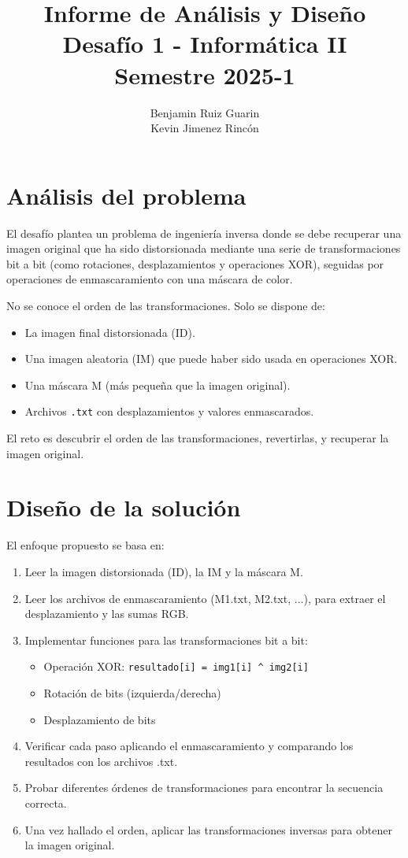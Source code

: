 \documentclass[11pt]{article}
\title{Informe de Análisis y Diseño\\Desafío 1 - Informática II\\Semestre 2025-1}
\author{Benjamin Ruiz Guarin\\Kevin Jimenez Rincón}
\begin{document}
\maketitle

\section{Análisis del problema}

El desafío plantea un problema de ingeniería inversa donde se debe recuperar una imagen original que ha sido distorsionada mediante una serie de transformaciones bit a bit (como rotaciones, desplazamientos y operaciones XOR), seguidas por operaciones de enmascaramiento con una máscara de color.

No se conoce el orden de las transformaciones. Solo se dispone de:
\begin{itemize}
  \item La imagen final distorsionada (ID).
  \item Una imagen aleatoria (IM) que puede haber sido usada en operaciones XOR.
  \item Una máscara M (más pequeña que la imagen original).
  \item Archivos \texttt{.txt} con desplazamientos y valores enmascarados.
\end{itemize}

El reto es descubrir el orden de las transformaciones, revertirlas, y recuperar la imagen original.

\section{Diseño de la solución}

El enfoque propuesto se basa en:

\begin{enumerate}
  \item Leer la imagen distorsionada (ID), la IM y la máscara M.
  \item Leer los archivos de enmascaramiento (M1.txt, M2.txt, ...), para extraer el desplazamiento y las sumas RGB.
  \item Implementar funciones para las transformaciones bit a bit:
  \begin{itemize}
    \item Operación XOR: \texttt{resultado[i] = img1[i] \^{} img2[i]}
    \item Rotación de bits (izquierda/derecha)
    \item Desplazamiento de bits
  \end{itemize}
  \item Verificar cada paso aplicando el enmascaramiento y comparando los resultados con los archivos .txt.
  \item Probar diferentes órdenes de transformaciones para encontrar la secuencia correcta.
  \item Una vez hallado el orden, aplicar las transformaciones inversas para obtener la imagen original.
\end{enumerate}
\end{document}

